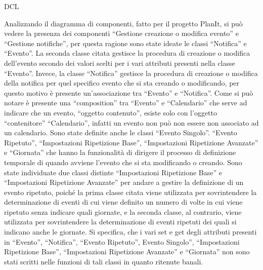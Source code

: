 \begin{listaPersonale}{DCL}
\begin{listaPersonale2}[DCL]{}
        Analizzando il diagramma di componenti, fatto per il progetto PlanIt, si può vedere la presenza dei componenti “Gestione creazione o modifica evento” e “Gestione notifiche”, per questa ragione sono state ideate le classi “Notifica” e “Evento”. La seconda classe citata gestisce la procedura di creazione o modifica dell'evento secondo dei valori scelti per i vari attributi presenti nella classe “Evento”. Invece, la classe “Notifica” gestisce la procedura di creazione o modifica della notifica per quel specifico evento che si sta creando o modificando, per questo motivo è presente un'associazione tra “Evento” e “Notifica”.
        Come si può notare è presente una “composition” tra “Evento” e “Calendario” che serve ad indicare che un evento, “oggetto contenuto”, esiste solo con l'oggetto “contenitore” “Calendario”, infatti un evento non può non essere non associato ad un calendario.
        Sono state definite anche le classi “Evento Singolo”. “Evento Ripetuto”, “Impostazioni Ripetizione Base”, “Impostazioni Ripetizione Avanzate” e “Giornata” che hanno la funzionalità di dirigere il processo di definizione temporale di quando avviene l'evento che si sta modificando o creando. Sono state individuate due classi distinte “Impostazioni Ripetizione Base” e “Impostazioni Ripetizione Avanzate” per andare a gestire la definizione di un evento ripetuto, poiché la prima classe citata viene utilizzata per sovrintendere la determinazione di eventi di cui viene definito un numero di volte in cui viene ripetuto senza indicare quali giornate, e la seconda classe, al contrario, viene utilizzata per sovrintendere la determinazione di eventi ripetuti dei quali si indicano anche le giornate.
        Si specifica, che i vari set e get degli attributi presenti in “Evento”, “Notifica”, “Evento Ripetuto”, Evento Singolo”, “Impostazioni Ripetizione Base”, “Impostazioni Ripetizione Avanzate” e “Giornata” non sono stati scritti nelle funzioni di tali classi in quanto ritenute banali.
        \begin{comment}
            \begin{center}
                \\
                \blfootnote{Immagine \href{https://github.com/Life-planner/Documentazione/blob/main/D3/img/Diagrammi/png/path/to/img.png}{PNG}/\href{https://github.com/Life-planner/Documentazione/blob/main/D3/img/Diagrammi/svg/path/to/img.svg}{SVG} nome file}
            \end{center}
        \end{comment}



\end{listaPersonale2}
\end{listaPersonale}
